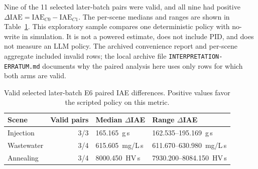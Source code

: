 \documentclass[10pt]{article}
\begin{document}
Nine of the 11 selected later-batch pairs were valid, and all nine had positive $\Delta\mathrm{IAE}=\mathrm{IAE}_{C0}-\mathrm{IAE}_{C1}$. The per-scene medians and ranges are shown in Table~\ref{tab:s7-e6}. This exploratory sample compares one deterministic policy with no-write in simulation. It is not a powered estimate, does not include PID, and does not measure an LLM policy. The archived convenience report and per-scene aggregate included invalid rows; the local archive file \texttt{INTERPRETATION-ERRATUM.md} documents why the paired analysis here uses only rows for which both arms are valid.

\begin{table}[htbp]
\centering
\caption{Valid selected later-batch E6 paired IAE differences. Positive values favor the scripted policy on this metric.}
\label{tab:s7-e6}
\footnotesize
\begin{tabularx}{\textwidth}{@{}l r X X@{}}
\toprule
Scene & Valid pairs & Median $\Delta$IAE & Range $\Delta$IAE \\
\midrule
Injection & 3/3 & 165.165~g\,s & 162.535--195.169~g\,s \\
Wastewater & 3/4 & 615.605~mg/L\,s & 611.670--630.980~mg/L\,s \\
Annealing & 3/4 & 8000.450~HV\,s & 7930.200--8084.150~HV\,s \\
\bottomrule
\end{tabularx}
\end{table}
\end{document}
